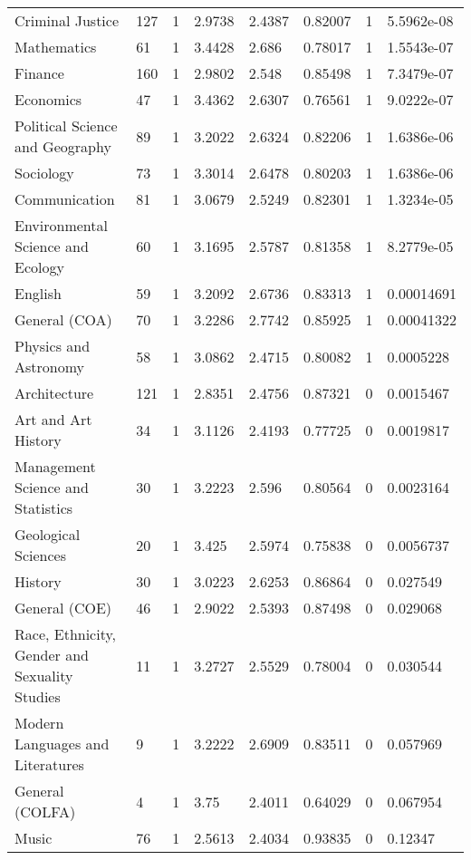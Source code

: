 \begin{sidewaystable}
{\begin{longtable}{llllllll}
Criminal Justice & 127 & 1 & 2.9738 & 2.4387 & 0.82007 & 1 & \color{green}5.5962e-08 \\ 
Mathematics & 61 & 1 & 3.4428 & 2.686 & 0.78017 & 1 & \color{green}1.5543e-07 \\ 
Finance & 160 & 1 & 2.9802 & 2.548 & 0.85498 & 1 & \color{green}7.3479e-07 \\ 
Economics & 47 & 1 & 3.4362 & 2.6307 & 0.76561 & 1 & \color{green}9.0222e-07 \\ 
Political Science and Geography & 89 & 1 & 3.2022 & 2.6324 & 0.82206 & 1 & \color{green}1.6386e-06 \\ 
Sociology & 73 & 1 & 3.3014 & 2.6478 & 0.80203 & 1 & \color{green}1.6386e-06 \\ 
Communication & 81 & 1 & 3.0679 & 2.5249 & 0.82301 & 1 & \color{green}1.3234e-05 \\ 
Environmental Science and Ecology & 60 & 1 & 3.1695 & 2.5787 & 0.81358 & 1 & \color{green}8.2779e-05 \\ 
English & 59 & 1 & 3.2092 & 2.6736 & 0.83313 & 1 & \color{green}0.00014691 \\ 
General (COA) & 70 & 1 & 3.2286 & 2.7742 & 0.85925 & 1 & \color{green}0.00041322 \\ 
Physics and Astronomy & 58 & 1 & 3.0862 & 2.4715 & 0.80082 & 1 & \color{green}0.0005228 \\ 
Architecture & 121 & 1 & 2.8351 & 2.4756 & 0.87321 & 0 & \color{green}0.0015467 \\ 
Art and Art History & 34 & 1 & 3.1126 & 2.4193 & 0.77725 & 0 & \color{green}0.0019817 \\ 
Management Science and Statistics & 30 & 1 & 3.2223 & 2.596 & 0.80564 & 0 & \color{green}0.0023164 \\ 
Geological Sciences & 20 & 1 & 3.425 & 2.5974 & 0.75838 & 0 & \color{green}0.0056737 \\ 
History & 30 & 1 & 3.0223 & 2.6253 & 0.86864 & 0 & \color{green}0.027549 \\ 
General (COE) & 46 & 1 & 2.9022 & 2.5393 & 0.87498 & 0 & \color{green}0.029068 \\ 
Race, Ethnicity, Gender and Sexuality Studies & 11 & 1 & 3.2727 & 2.5529 & 0.78004 & 0 & \color{green}0.030544 \\ 
Modern Languages and Literatures & 9 & 1 & 3.2222 & 2.6909 & 0.83511 & 0 & 0.057969 \\ 
General (COLFA) & 4 & 1 & 3.75 & 2.4011 & 0.64029 & 0 & 0.067954 \\ 
Music & 76 & 1 & 2.5613 & 2.4034 & 0.93835 & 0 & 0.12347 \\ 

\end{longtable}}
\end{sidewaystable}
